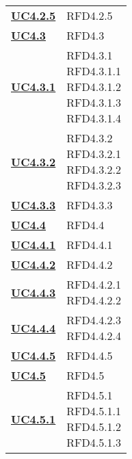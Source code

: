 \begin{longtable}[H]{| >{\centering\bfseries}p{8cm} | >{\centering\arraybackslash}p{8cm} |}
    \hyperref[par:uc4.2.5]{UC4.2.5} & RFD4.2.5 \\

    \hyperref[ssub:uc4.3]{UC4.3} & RFD4.3 \\

    \hyperref[par:uc4.3.1]{UC4.3.1} & \makecell{
        RFD4.3.1 \\ 
        RFD4.3.1.1 \\ 
        RFD4.3.1.2 \\ 
        RFD4.3.1.3 \\ 
        RFD4.3.1.4} \\

    \hyperref[par:uc4.3.2]{UC4.3.2} & \makecell{
        RFD4.3.2 \\ 
        RFD4.3.2.1 \\
        RFD4.3.2.2 \\
        RFD4.3.2.3} \\

    \hyperref[par:uc4.3.3]{UC4.3.3} & RFD4.3.3 \\


    \hyperref[ssub:uc4.4]{UC4.4} & RFD4.4 \\

    \hyperref[par:uc4.4.1]{UC4.4.1} & RFD4.4.1 \\

    \hyperref[par:uc4.4.2]{UC4.4.2} & RFD4.4.2 \\

    \hyperref[par:uc4.4.3]{UC4.4.3}  & \makecell{
        RFD4.4.2.1 \\ 
        RFD4.4.2.2} \\

    \hyperref[par:uc4.4.4]{UC4.4.4} & \makecell{
        RFD4.4.2.3 \\ 
        RFD4.4.2.4} \\

    \hyperref[par:uc4.4.5]{UC4.4.5} & RFD4.4.5 \\




    \hyperref[ssub:uc4.5]{UC4.5} & RFD4.5 \\

    \hyperref[par:uc4.5.1]{UC4.5.1}  & \makecell{
        RFD4.5.1 \\
        RFD4.5.1.1 \\
        RFD4.5.1.2 \\
        RFD4.5.1.3} \\


\end{longtable}
